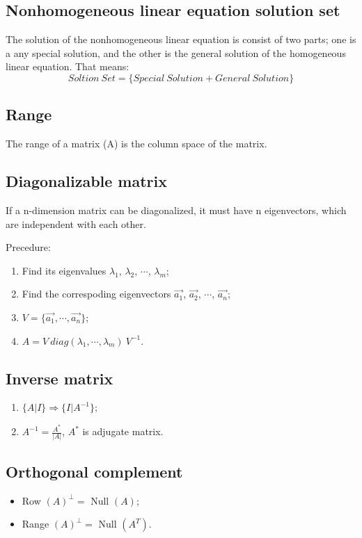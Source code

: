 \documentclass{article}
\begin{document}
    \subsection*{Nonhomogeneous linear equation solution set} 
    The solution of the nonhomogeneous linear equation is consist of two parts; one is a any special solution, and the other is the general solution of the homogeneous linear equation. That means: 
    \begin{equation}
        Soltion\ Set = \{Special\ Solution + General\ Solution\}
    \end{equation}
    \subsection*{Range}
    The range of a matrix (A) is the column space of the matrix. 
    \subsection*{Diagonalizable matrix}
    If a n-dimension matrix can be diagonalized, it must have n eigenvectors, which are independent with each other. 

    Precedure: 
    \begin{enumerate}
        \item Find its eigenvalues $\lambda_1$, $\lambda_2$, $\cdots$, $\lambda_m$;
        \item Find the correspoding eigenvectors $\vec{a_1}$, $\vec{a_2}$, $\cdots$, $\vec{a_n}$; 
        \item $V=\{\vec{a_1}, \cdots, \vec{a_n}\}$; 
        \item $A=V\ diag(\lambda_1, \cdots, \lambda_m)\ V^{-1}$. 
    \end{enumerate}
    \subsection*{Inverse matrix}
    \begin{enumerate}
        \item $\{A|I\}\Rightarrow\{I|A^{-1}\}$; 
        \item $A^{-1}=\frac{A^{*}}{|A|}$, $A^{*}$ is adjugate matrix. 
    \end{enumerate}
    \subsection*{Orthogonal complement}
    \begin{itemize}
        \item Row $(A)^{\perp}=$ Null $(A)$;
        \item Range $(A)^{\perp}=$ Null $(A^{T})$. 
    \end{itemize}
\end{document}

